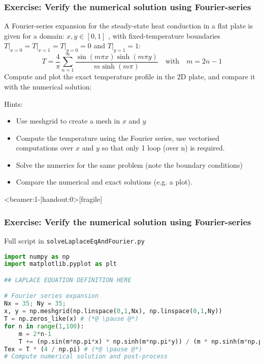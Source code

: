   

{\nologo
\begin{frame}[fragile]
  \frametitle{Exercise: Verify the numerical solution using Fourier-series}
  A Fourier-series expansion for the steady-state heat conduction in a flat plate is given for a domain: $x,y\in[0,1]$ , with fixed-temperature boundaries $T\big|_{x=0} = T\big|_{x=1} = T\big|_{y=0}=0$ and $T\big|_{y=1}=1$:
\[
    T = \frac{4}{\pi} \sum_{n=1}^\infty \frac{\sin\left(m \pi x \right)\sinh\left(m\pi y \right)}{m \sinh\left(m \pi \right)} \quad \text{with} \quad m=2n-1
\]
Compute and plot the exact temperature profile in the 2D plate, and compare it with the numerical solution:
  \begin{hints}
  Hints:
  \begin{itemize}
      \item Use meshgrid to create a mesh in $x$ and $y$
      \item Compute the temperature using the Fourier series, use vectorised computations over $x$ and $y$ so that only 1 loop (over n) is required.
      \item Solve the numerics for the same problem (note the boundary conditions)
      \item Compare the numerical and exact solutions (e.g. a plot).
  \end{itemize}
  \end{hints}
\end{frame}

\begin{frame}<beamer:1-|handout:0>[fragile]
  \frametitle{Exercise: Verify the numerical solution using Fourier-series}
  Full script in \lstinline{solveLaplaceEqAndFourier.py}
    \begin{lstlisting}[language=Python, basicstyle=\tiny]
import numpy as np
import matplotlib.pyplot as plt

## LAPLACE EQUATION DEFINITION HERE

# Fourier series expansion
Nx = 35; Ny = 35;
x, y = np.meshgrid(np.linspace(0,1,Nx), np.linspace(0,1,Ny))
T = np.zeros_like(x) # (*@ \pause @*)
for n in range(1,100):
    m = 2*n-1
    T += (np.sin(m*np.pi*x) * np.sinh(m*np.pi*y)) / (m * np.sinh(m*np.pi))
Tex = T * (4 / np.pi) # (*@ \pause @*)
# Compute numerical solution and post-process


\end{lstlisting}
\end{frame}}
